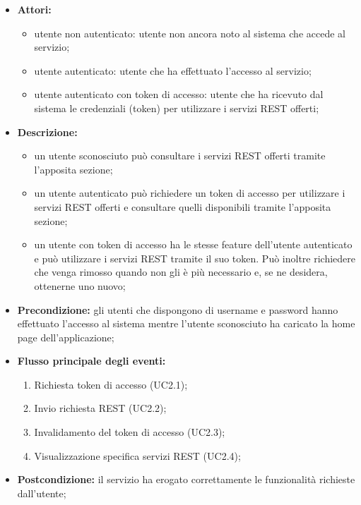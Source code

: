 \begin{itemize}
	\item \textbf{Attori:}
	\begin{itemize}
		\item utente non autenticato: utente non ancora noto al sistema che accede al servizio;
		\item utente autenticato: utente che ha effettuato l'accesso al servizio;
		\item utente autenticato con token di accesso: utente che ha ricevuto dal sistema le credenziali (token) per utilizzare i servizi REST offerti;
	\end{itemize}
	\item \textbf{Descrizione:}
	\begin{itemize}
		\item un utente sconosciuto può consultare i servizi REST offerti tramite l'apposita sezione;
		\item un utente autenticato può richiedere un token di accesso per utilizzare i servizi REST offerti e consultare quelli disponibili tramite l'apposita sezione;
		\item un utente con token di accesso ha le stesse feature dell'utente autenticato e può utilizzare i servizi REST tramite il suo token. Può inoltre richiedere che venga rimosso quando non gli è più necessario e, se ne desidera, ottenerne uno nuovo;
	\end{itemize}
	\item \textbf{Precondizione:} gli utenti che dispongono di username e password hanno effettuato l'accesso al sistema mentre l'utente sconosciuto ha caricato la home page dell'applicazione;
	\item \textbf{Flusso principale degli eventi:}
	\begin{enumerate}
		\item Richiesta token di accesso (UC2.1);
		\item Invio richiesta REST (UC2.2);
		\item Invalidamento del token di accesso (UC2.3);
		\item Visualizzazione specifica servizi REST (UC2.4);
	\end{enumerate}
	\item \textbf{Postcondizione:} il servizio ha erogato correttamente le funzionalità richieste dall'utente;
\end{itemize}

\pagebreak


